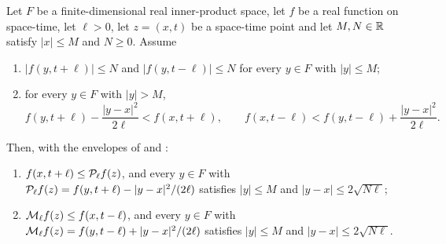 \begin{lemma}
Let $F$ be a finite-dimensional real inner-product space, let $f$ be a real
function on space-time, let $\ell>0$, let $z=(x,t)$ be a space-time point and let
$M,N\in\mathbb{R}$ satisfy $|x|\le M$ and $N\ge0$. Assume
\begin{enumerate}
\item[(a)] $|f(y,t+\ell)|\le N$ and $|f(y,t-\ell)|\le N$ for every $y\in F$ with
$|y|\le M$;
\item[(b)] for every $y\in F$ with $|y|>M$,
\[
  f(y,t+\ell)-\frac{|y-x|^2}{2\ell}<f(x,t+\ell),
  \qquad
  f(x,t-\ell)<f(y,t-\ell)+\frac{|y-x|^2}{2\ell}.
\]
\end{enumerate}
Then, with the envelopes of  and :
\begin{enumerate}
\item $f(x,t+\ell)\le\mathcal{P}_\ell f(z)$, and every $y\in F$ with
$\mathcal{P}_\ell f(z)=f(y,t+\ell)-|y-x|^2/(2\ell)$ satisfies $|y|\le M$ and
$|y-x|\le2\sqrt{N\ell}$;
\item $\mathcal{M}_\ell f(z)\le f(x,t-\ell)$, and every $y\in F$ with
$\mathcal{M}_\ell f(z)=f(y,t-\ell)+|y-x|^2/(2\ell)$ satisfies $|y|\le M$ and
$|y-x|\le2\sqrt{N\ell}$.
\end{enumerate}
\end{lemma}
